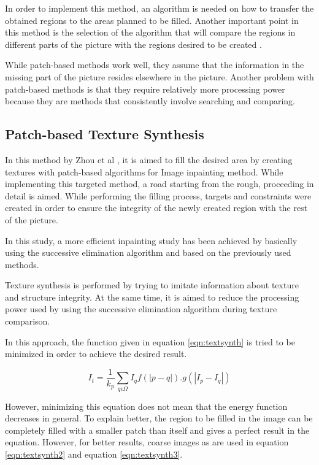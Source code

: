 In order to implement this method, an algorithm is needed on how to transfer the obtained regions to the areas planned to be filled. Another important point in this method is the selection of the algorithm that will compare the regions in different parts of the picture with the regions desired to be created \cite{patchmatch}.

While patch-based methods work well, they assume that the information in the missing part of the picture resides elsewhere in the picture. Another problem with patch-based methods is that they require relatively more processing power because they are methods that consistently involve searching and comparing.

\subsection{Patch-based Texture Synthesis}

In this method by Zhou et al \cite{patch_based_tex_synthesis}, it is aimed to fill the desired area by creating textures with patch-based algorithms for Image inpainting method. While implementing this targeted method, a road starting from the rough, proceeding in detail is aimed. While performing the filling process, targets and constraints were created in order to ensure the integrity of the newly created region with the rest of the picture.

In this study, a more efficient inpainting study has been achieved by basically using the successive elimination algorithm and based on the previously used methods.

Texture synthesis is performed by trying to imitate information about texture and structure integrity. At the same time, it is aimed to reduce the processing power used by using the successive elimination algorithm during texture comparison.

In this approach, the function given in equation \ref{eqn:textsynth} is tried to be minimized in order to achieve the desired result.

\begin{equation}
    \label{eqn:textsynth}
    I_t = \frac{1}{k_p} \displaystyle\sum\limits_{q\epsilon\Omega} {I_qf(|p-q|).g(|I_p-I_q|)}
\end{equation}

However, minimizing this equation does not mean that the energy function decreases in general. To explain better, the region to be filled in the image can be completely filled with a smaller patch than itself and gives a perfect result in the equation. However, for better results, coarse images as  are used in equation \ref{eqn:textsynth2} and equation \ref{eqn:textsynth3}.

